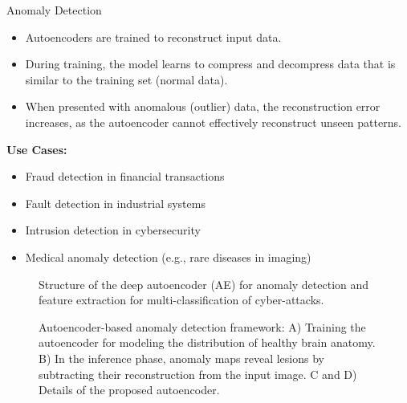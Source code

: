 \begin{frame}[allowframebreaks]{Anomaly Detection}
    \begin{itemize}
        \item Autoencoders are trained to reconstruct input data.
        \item During training, the model learns to compress and decompress data that is similar to the training set (normal data).
        \item When presented with anomalous (outlier) data, the reconstruction error increases, as the autoencoder cannot effectively reconstruct unseen patterns.
    \end{itemize}

    \textbf{Use Cases:}
    \begin{itemize}
        \item Fraud detection in financial transactions
        \item Fault detection in industrial systems
        \item Intrusion detection in cybersecurity
        \item Medical anomaly detection (e.g., rare diseases in imaging)
    \end{itemize}

    \framebreak
    \begin{figure}
        \centering
        \caption*{Structure of the deep autoencoder (AE) for anomaly detection and feature extraction for multi-classification of cyber-attacks.}
    \end{figure}

    \framebreak
    \begin{figure}
        \centering
        \caption*{Autoencoder-based anomaly detection framework: A) Training the autoencoder for modeling the distribution of healthy brain anatomy. B) In the inference phase, anomaly maps reveal lesions by subtracting their reconstruction from the input image. C and D) Details of the proposed autoencoder.}
    \end{figure}
    
\end{frame}